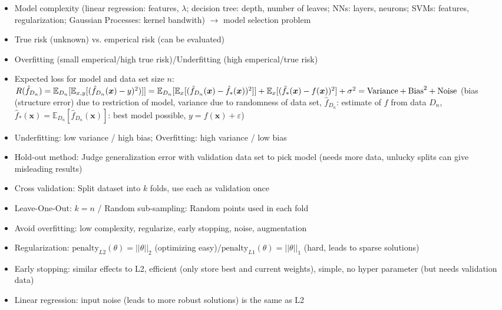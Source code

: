 \documentclass[11pt]{scrartcl}
\begin{document}
\begin{itemize}
    \item Model complexity (linear regression: features, \(\lambda\); decision tree: depth, 
        number of leaves; NNs: layers, neurons; SVMs: features, regularization; Gaussian 
        Processes: kernel bandwith) \(\rightarrow\) model selection problem
    \item True risk (unknown) vs. emperical risk (can be evaluated)
    \item Overfitting (small emperical/high true risk)/Underfitting (high emperical/true risk)
    \item Expected loss for model and data set size \( n \): \(R(\hat{f}_{D_n}) = 
        \mathbb{E}_{D_n} [ \mathbb{E}_{x, y} [ ( \hat{f}_{D_n} ( \bm{x} ) - y )^2 ) ] ] \\ = 
        \mathbb{E}_{D_n} [ \mathbb{E}_{x} [ ( \hat{f}_{D_n} ( \bm{x} ) - 
        \hat{f}_* ( \bm{x} ) )^2 ] ] + 
        \mathbb{E}_{x} [ ( \hat{f}_* ( \bm{x} ) - f ( \bm{x} ) )^2 ] + \sigma^2 \\ = 
        \mathrm{Variance} + \mathrm{Bias}^2 + \mathrm{Noise} \) (bias (structure error) due to 
        restriction of model, variance due to randomness of data set, \( \hat{f}_{D_n} \): 
        estimate of \( f \) from data \( D_n \), \( \hat{f}_* ( \bm{x} ) = 
        \mathbb{E}_{D_n} [ \hat{f}_{D_n} ( \bm{x} ) ] \): best model possible, \(y = 
        f( \bm{x} ) + \varepsilon \))
    \item Underfitting: low variance / high bias; Overfitting: high variance / low bias
    \item Hold-out method: Judge generalization error with validation data set to pick model 
        (needs more data, unlucky splits can give misleading results)
    \item Cross validation: Split dataset into \( k \) folds, use each as validation once
    \item Leave-One-Out: \( k = n \) / Random sub-sampling: Random points used in each fold
    \item Avoid overfitting: low complexity, regularize, early stopping, noise, augmentation
    \item Regularization: \( \mathrm{penalty}_{L2} ( \theta ) = || \theta ||_2 \) (optimizing 
        easy)/\( \mathrm{penalty}_{L1} ( \theta ) = || \theta ||_1 \) (hard, leads to sparse solutions)
    \item Early stopping: similar effects to L2, efficient (only store best and current weights), 
        simple, no hyper parameter (but needs validation data)
    \item Linear regression: input noise (leads to more robust solutions) is the same as L2
\end{itemize}
\end{document}
